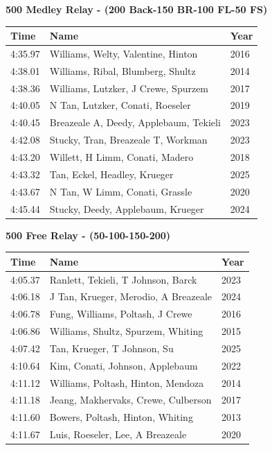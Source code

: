 \noindent\begin{minipage}[t]{0.98\textwidth}
\centering
\textbf{\textcolor{teamprimary}{500 Medley Relay - (200 Back-150 BR-100 FL-50 FS)}}\par
\vspace{0.5em}
\centering
\small
\renewcommand{\arraystretch}{1.0}
\setlength{\tabcolsep}{4pt}
\begin{tabular}{@{}p{4.5cm}p{8.5cm}p{2.5cm}@{}}
\toprule
\textbf{Time} & \textbf{Name} & \textbf{Year} \\
\midrule
4:35.97 & Williams, Welty, Valentine, Hinton & 2016 \\
4:38.01 & Williams, Ribal, Blumberg, Shultz & 2014 \\
4:38.36 & Williams, Lutzker, J Crewe, Spurzem & 2017 \\
4:40.05 & N Tan, Lutzker, Conati, Roeseler & 2019 \\
4:40.45 & Breazeale A, Deedy, Applebaum, Tekieli & 2023 \\
4:42.08 & Stucky, Tran, Breazeale T, Workman & 2023 \\
4:43.20 & Willett, H Limm, Conati, Madero & 2018 \\
4:43.32 & Tan, Eckel, Headley, Krueger & 2025 \\
4:43.67 & N Tan, W Limm, Conati, Grassle & 2020 \\
4:45.44 & Stucky, Deedy, Applebaum, Krueger & 2024 \\
\bottomrule
\end{tabular}
\end{minipage}
\vspace{1.2em}
\noindent\begin{minipage}[t]{0.98\textwidth}
\centering
\textbf{\textcolor{teamprimary}{500 Free Relay - (50-100-150-200)}}\par
\vspace{0.5em}
\centering
\small
\renewcommand{\arraystretch}{1.0}
\setlength{\tabcolsep}{4pt}
\begin{tabular}{@{}p{4.5cm}p{8.5cm}p{2.5cm}@{}}
\toprule
\textbf{Time} & \textbf{Name} & \textbf{Year} \\
\midrule
4:05.37 & Ranlett, Tekieli, T Johnson, Barck & 2023 \\
4:06.18 & J Tan, Krueger, Merodio, A Breazeale & 2024 \\
4:06.78 & Fung, Williams, Poltash, J Crewe & 2016 \\
4:06.86 & Williams, Shultz, Spurzem, Whiting & 2015 \\
4:07.42 & Tan, Krueger, T Johnson, Su & 2025 \\
4:10.64 & Kim, Conati, Johnson, Applebaum & 2022 \\
4:11.12 & Williams, Poltash, Hinton, Mendoza & 2014 \\
4:11.18 & Jeang, Makhervaks, Crewe, Culberson & 2017 \\
4:11.60 & Bowers, Poltash, Hinton, Whiting & 2013 \\
4:11.67 & Luis, Roeseler, Lee, A Breazeale & 2020 \\
\bottomrule
\end{tabular}
\end{minipage}
\vspace{-0.5em}
\clearpage
